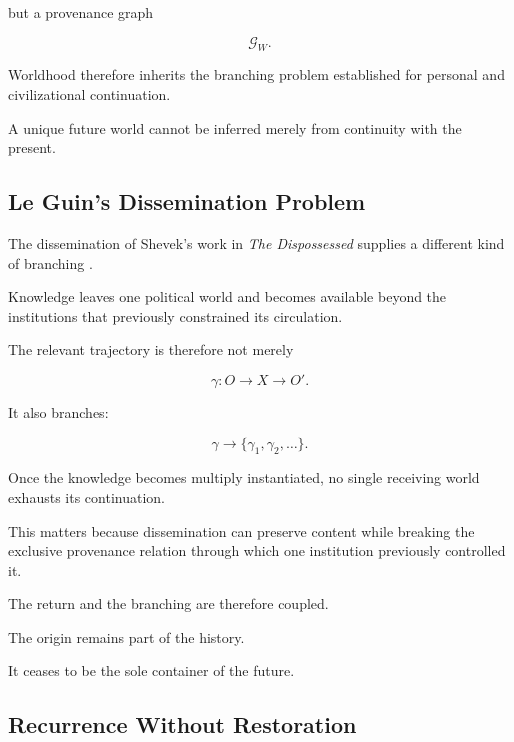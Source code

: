 \documentclass[
  11pt,
  a4paper,
  DIV=12,
  BCOR=0mm,
  parskip=half-
]{scrartcl}
\newcommand{\graphG}{\mathcal G}
\theoremstyle{definition}
\theoremstyle{plain}
\theoremstyle{remark}
\begin{document}
but a provenance graph

\[
  \graphG_W.
\]

Worldhood therefore inherits the branching problem established for personal
and civilizational continuation.

A unique future world cannot be inferred merely from continuity with the
present.


\subsection{Le Guin's Dissemination Problem}
\label{app:leguin-worlds}

The dissemination of Shevek's work in \emph{The Dispossessed} supplies a
different kind of branching \cite{leguin1974}.

Knowledge leaves one political world and becomes available beyond the
institutions that previously constrained its circulation.

The relevant trajectory is therefore not merely

\[
  \gamma:
  O\to X\to O'.
\]

It also branches:

\[
  \gamma
  \longrightarrow
  \{
    \gamma_1,
    \gamma_2,
    \ldots
  \}.
\]

Once the knowledge becomes multiply instantiated, no single receiving world
exhausts its continuation.

This matters because dissemination can preserve content while breaking the
exclusive provenance relation through which one institution previously
controlled it.

The return and the branching are therefore coupled.

The origin remains part of the history.

It ceases to be the sole container of the future.


\subsection{Recurrence Without Restoration}
\label{app:world-recurrence}
\end{document}
